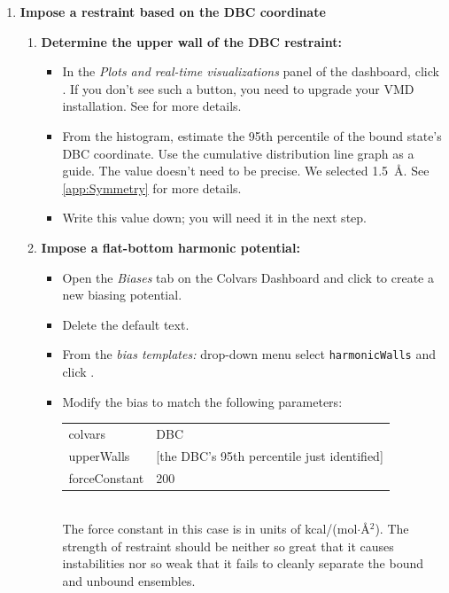 \documentclass[9pt,tutorial]{Styling/livecoms}
\newcommand{\button}[1]{\inlineBox[gray]{\texttt{#1}}}
\newcommand{\menu}[1]{\textit{#1}}
\newcommand{\option}[1]{\texttt{#1}}
\begin{document}
\begin{enumerate}
        
        \item \textbf{Impose a restraint based on the DBC coordinate}
        \begin{enumerate}[label=\alph*., ref=\theenumi.\alph*]
            \item \textbf{Determine the upper wall of the DBC restraint:}
            \begin{itemize}
                \item In the \menu{Plots and real-time visualizations} panel of the dashboard, click \button{Histogram}. 
                If you don't see such a button, you need to upgrade your VMD installation. See  for more details.
                \item From the histogram, estimate the 95th percentile of the bound state's DBC coordinate. Use the cumulative distribution line graph as a guide. The value doesn't need to be precise.  We selected 1.5~\AA. See \ref{app:Symmetry} for more details.
                \item Write this value down; you will need it in the next step. 
            \end{itemize}
            \item \textbf{Impose a flat-bottom harmonic potential:}
            \label{step:createDBC}
            \begin{itemize}
                \item Open the \menu{Biases} tab on the Colvars Dashboard and click \button{New bias [Ctrl-n]} to create a new biasing potential.
                \item Delete the default text.
                \item From the \menu{bias templates:} drop-down menu select \option{harmonicWalls} and click \button{Insert [Enter]}.
                \item Modify the bias to match the following parameters: \\
                { \ttfamily
                \begin{tabular}{l l}
                    colvars & DBC\\
                    upperWalls & [the DBC's 95th percentile just identified]\\
                    forceConstant & 200 \\
                \end{tabular} }\\
                The force constant in this case is in units of kcal/(mol$\cdot$\AA{}$^2$). The strength of restraint should be neither so great that it causes instabilities nor so weak that it fails to cleanly separate the bound and unbound ensembles.

\end{itemize}
\end{enumerate}
\end{enumerate}
\end{document}
